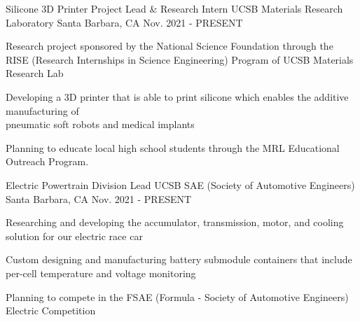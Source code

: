 

\begin{cventries}
\cventry
{Silicone 3D Printer Project Lead \& Research Intern} %
{UCSB Materials Research Laboratory} %
{Santa Barbara, CA} %
{Nov. 2021 - PRESENT} %
{ %
\begin{cvitems}
\item {Research project sponsored by the National Science Foundation through the \\ RISE (Research Internships in Science Engineering) Program of UCSB Materials Research Lab}
\item {Developing a 3D printer that is able to print silicone which enables the additive manufacturing of \\ pneumatic soft robots and medical implants}
\item {Planning to educate local high school students through the MRL Educational Outreach Program.}
\end{cvitems}
}


\cventry
{Electric Powertrain Division Lead} %
{UCSB SAE (Society of Automotive Engineers)} %
{Santa Barbara, CA} %
{Nov. 2021 - PRESENT} %
{ %
\begin{cvitems}
\item {Researching and developing the accumulator, transmission, motor, and cooling solution for our electric race car}
\item {Custom designing and manufacturing battery submodule containers that include per-cell temperature and voltage monitoring}
\item {Planning to compete in the FSAE (Formula - Society of Automotive Engineers) Electric Competition}
\end{cvitems}
}






\end{cventries}
